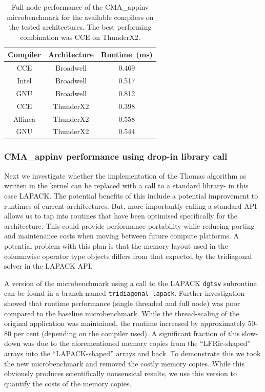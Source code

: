 \begin{table}[t]
  \scriptsize
  \begin{center}
    \caption{Full node performance of the CMA\_appinv microbenchmark for the available compilers on the tested architectures.
      The best performing combination was CCE on ThunderX2.}
    \label{tab:cma_table}
     \begin{tabular}{|c|c|c|}
      \textbf{Compiler} & \textbf{Architecture} & \textbf{Runtime~(ms)} \\
      \hline
      CCE & Broadwell & 0.469 \\
      Intel & Broadwell & 0.517 \\
      GNU & Broadwell & 0.812 \\
      CCE & ThunderX2 & 0.398 \\
      Allinea & ThunderX2 & 0.558 \\
      GNU & ThunderX2 & 0.544 \\
    \end{tabular}
  \end{center}
\end{table}



\subsubsection{CMA\_appinv performance using drop-in library call}
Next we investigate whether the implementation of the Thomas algorithm as written in the kernel can be replaced with a call to a standard library- in this case LAPACK.
The potential benefits of this include a potential improvement to runtimes of current architectures.
But, more importantly calling a standard API allows us to tap into routines that have been optimised specifically for the architecture.
This could provide performance portability while reducing porting and maintenance costs when moving between future compute platforms.
A potential problem with this plan is that the memory layout used in the columnwise operator type objects differs from that expected by the tridiagonal solver in the LAPACK API.

A version of the microbenchmark using a call to the LAPACK \verb+dgtsv+ subroutine can be found in a branch named \verb+tridiagonal_lapack+.
Further investigation showed that runtime performance (single threaded and full node) was poor compared to the baseline microbenchmark.
While the thread-scaling of the original application was maintained, the runtime increased by approximately 50-80 per cent (depending on the compiler used).
A significant fraction of this slow-down was due to the aforementioned memory copies from the ``LFRic-shaped'' arrays into the ``LAPACK-shaped'' arrays and back.
To demonstrate this we took the new microbenchmark and removed the costly memory copies.
While this obviously produces scientifically nonsensical results, we use this version to quantify the costs of the memory copies.

